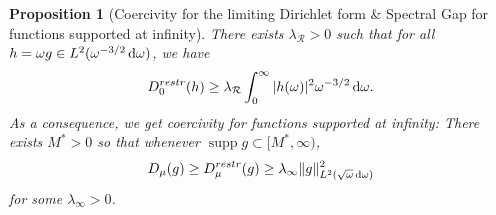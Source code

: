 \documentclass[reqno,11pt,letterpaper]{amsart}
\numberwithin{equation}{section}
\newcommand{\dd}{\, {\rm d}}
\newtheorem{proposition}{Proposition}[section]
\begin{document}
\begin{proposition}[Coercivity for the limiting Dirichlet form \& Spectral Gap for functions supported at infinity] \label{Prop:SG_at_infty}
There exists $\lambda_{\mathcal{R}}>0$ such that for all $h=\omega g \in L^2(\omega^{-3/2}\dd\omega)$, we have 
\begin{equation}\label{eq:SG_at_infty_1}
    D_0^{restr}(h) \ge
    \lambda_{\mathcal{R}}
    \int_0^\infty |h(\omega)|^2\omega^{-3/2} \dd \omega.
\end{equation} 
As a consequence, we get coercivity for functions supported at infinity: There exists $M^*>0$ so that whenever $\operatorname{supp} g \subset [M^*, \infty)$,
\begin{equation}\label{eq:SG_at_infty_2}
   D_\mu (g) \geq D_\mu^{restr}(g) \geq \lambda_{\infty} \|g\|_{L^2(\sqrt{\omega}\dd\omega)}^2
\end{equation} 
for some $\lambda_{\infty}>0$. 
\end{proposition}
\end{document}
